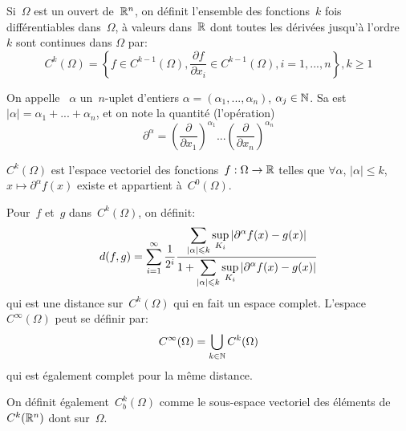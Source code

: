 \medskip
\begin{definition}
Si~$\Omega$ est un ouvert de~$\mathbb R^n$, on définit l'ensemble des fonctions~$k$ fois différentiables dans~$\Omega$, à valeurs dans~$\mathbb R$ dont toutes les dérivées jusqu'à l'ordre~$k$ sont continues dans $\Omega$ par:
\begin{equation}
C^k(\Omega) = \left\{f\in C^{k-1}(\Omega), \dfrac{\partial f}{\partial x_i}\in C^{k-1}(\Omega),
i=1, ..., n\right\}, k\ge 1
\end{equation}
\end{definition}

\medskip
\begin{definition}
On appelle ~$\alpha$ un~$n$-uplet d'entiers $\alpha=(\alpha_1, ..., \alpha_n)$, $\alpha_j\in\mathbb N$.
Sa  est~$|\alpha|=\alpha_1+ ... + \alpha_n$, et on note  la quantité (l'opération)
\begin{equation}
   \partial^\alpha=\left(\dfrac{\partial}{\partial x_1}\right)^{\alpha_1}...\left(\dfrac{\partial}{\partial x_n}\right)^{\alpha_n}\end{equation}
\end{definition}

\medskip{}
$C^k(\Omega)$ est l'espace vectoriel des fonctions~$f: \Omega \to \mathbb R$ telles que $\forall \alpha$, $|\alpha|\le k$, $x\mapsto \partial^\alpha f(x)$ existe et appartient à~$C^0(\Omega)$.

Pour~$f$ et~$g$ dans~$C^k(\Omega)$, on définit:
\begin{equation}
d(f,g)=\dsum_{i=1}^\infty \dfrac1{2^i}\dfrac{\dsum_{|\alpha|\le k} \sup_{K_i}|\partial^\alpha f(x)-g(x)|}{%
1+\dsum_{|\alpha|\le k} \sup_{K_i}|\partial^\alpha f(x)-g(x)|}
\end{equation}
qui est une distance sur~$C^k(\Omega)$ qui en fait un espace complet. L'espace~$C^\infty(\Omega)$ peut se définir par:
\begin{equation} C^\infty(\Omega)=\bigcup\limits_{k\in\mathbb N}C^k(\Omega)\end{equation}
qui est également complet pour la même distance.

\bigskip{}
On définit également~$C^k_b(\Omega)$ comme le sous-espace vectoriel des éléments de~$C^k(\mathbb R^n)$ dont  sur~$\Omega$.

